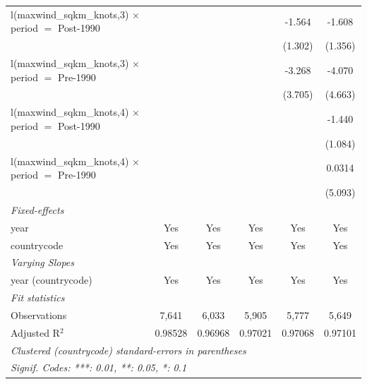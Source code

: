 \begin{tabular}{lccccc}
   l(maxwind\_sqkm\_knots,3) $\times$ period $=$ Post-1990    &          &                &                & -1.564         & -1.608\\   
                                                              &          &                &                & (1.302)        & (1.356)\\   
   l(maxwind\_sqkm\_knots,3) $\times$ period $=$ Pre-1990     &          &                &                & -3.268         & -4.070\\   
                                                              &          &                &                & (3.705)        & (4.663)\\   
   l(maxwind\_sqkm\_knots,4) $\times$ period $=$ Post-1990    &          &                &                &                & -1.440\\   
                                                              &          &                &                &                & (1.084)\\   
   l(maxwind\_sqkm\_knots,4) $\times$ period $=$ Pre-1990     &          &                &                &                & 0.0314\\   
                                                              &          &                &                &                & (5.093)\\   
   \midrule
   \emph{Fixed-effects}\\
   year                                                       & Yes      & Yes            & Yes            & Yes            & Yes\\  
   countrycode                                                & Yes      & Yes            & Yes            & Yes            & Yes\\  
   \midrule
   \emph{Varying Slopes}\\
   year (countrycode)                                         & Yes      & Yes            & Yes            & Yes            & Yes\\  
   \midrule
   \emph{Fit statistics}\\
   Observations                                               & 7,641    & 6,033          & 5,905          & 5,777          & 5,649\\  
   Adjusted R$^2$                                             & 0.98528  & 0.96968        & 0.97021        & 0.97068        & 0.97101\\  
   \midrule \midrule
   \multicolumn{6}{l}{\emph{Clustered (countrycode) standard-errors in parentheses}}\\
   \multicolumn{6}{l}{\emph{Signif. Codes: ***: 0.01, **: 0.05, *: 0.1}}\\
\end{tabular}
\par\endgroup



